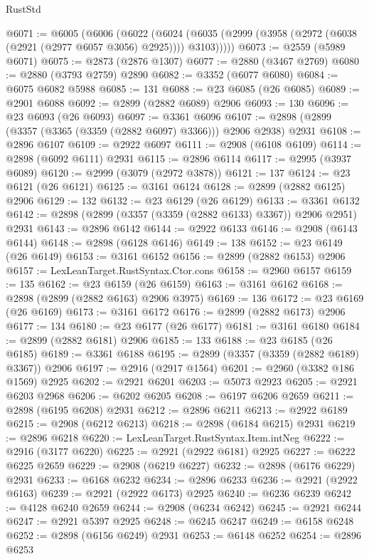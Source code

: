 \begin{lexlean}{RustStd}
\begin{coremodule}
@6071 := @6005
    (@6006
      (@6022
        (@6024 (@6035 (@2999 (@3958 (@2972 (@6038 (@2921 (@2977 @6057 @3056) @2925)))) @3103)))))
@6073 := @2559 (@5989 @6071)
@6075 := @2873 (@2876 @1307)
@6077 := @2880 (@3467 @2769)
@6080 := @2880 (@3793 @2759) @2890
@6082 := @3352 (@6077 @6080)
@6084 := @6075 @6082 @5988
@6085 := 131
@6088 := @23 @6085 (@26 @6085)
@6089 := @2901 @6088
@6092 := @2899 (@2882 @6089) @2906
@6093 := 130
@6096 := @23 @6093 (@26 @6093)
@6097 := @3361 @6096
@6107 := @2898 (@2899 (@3357 (@3365 (@3359 (@2882 @6097) @3366))) @2906 @2938) @2931
@6108 := @2896 @6107
@6109 := @2922 @6097
@6111 := @2908 (@6108 @6109)
@6114 := @2898 (@6092 @6111) @2931
@6115 := @2896 @6114
@6117 := @2995 (@3937 @6089)
@6120 := @2999 (@3079 (@2972 @3878))
@6121 := 137
@6124 := @23 @6121 (@26 @6121)
@6125 := @3161 @6124
@6128 := @2899 (@2882 @6125) @2906
@6129 := 132
@6132 := @23 @6129 (@26 @6129)
@6133 := @3361 @6132
@6142 := @2898 (@2899 (@3357 (@3359 (@2882 @6133) @3367)) @2906 @2951) @2931
@6143 := @2896 @6142
@6144 := @2922 @6133
@6146 := @2908 (@6143 @6144)
@6148 := @2898 (@6128 @6146)
@6149 := 138
@6152 := @23 @6149 (@26 @6149)
@6153 := @3161 @6152
@6156 := @2899 (@2882 @6153) @2906
@6157 := LexLeanTarget.RustSyntax.Ctor.cons
@6158 := @2960 @6157
@6159 := 135
@6162 := @23 @6159 (@26 @6159)
@6163 := @3161 @6162
@6168 := @2898 (@2899 (@2882 @6163) @2906 @3975)
@6169 := 136
@6172 := @23 @6169 (@26 @6169)
@6173 := @3161 @6172
@6176 := @2899 (@2882 @6173) @2906
@6177 := 134
@6180 := @23 @6177 (@26 @6177)
@6181 := @3161 @6180
@6184 := @2899 (@2882 @6181) @2906
@6185 := 133
@6188 := @23 @6185 (@26 @6185)
@6189 := @3361 @6188
@6195 := @2899 (@3357 (@3359 (@2882 @6189) @3367)) @2906
@6197 := @2916 (@2917 @1564)
@6201 := @2960 (@3382 @186 @1569) @2925
@6202 := @2921 @6201
@6203 := @5073 @2923
@6205 := @2921 @6203 @2968
@6206 := @6202 @6205
@6208 := @6197 @6206 @2659
@6211 := @2898 (@6195 @6208) @2931
@6212 := @2896 @6211
@6213 := @2922 @6189
@6215 := @2908 (@6212 @6213)
@6218 := @2898 (@6184 @6215) @2931
@6219 := @2896 @6218
@6220 := LexLeanTarget.RustSyntax.Item.intNeg
@6222 := @2916 (@3177 @6220)
@6225 := @2921 (@2922 @6181) @2925
@6227 := @6222 @6225 @2659
@6229 := @2908 (@6219 @6227)
@6232 := @2898 (@6176 @6229) @2931
@6233 := @6168 @6232
@6234 := @2896 @6233
@6236 := @2921 (@2922 @6163)
@6239 := @2921 (@2922 @6173) @2925
@6240 := @6236 @6239
@6242 := @4128 @6240 @2659
@6244 := @2908 (@6234 @6242)
@6245 := @2921 @6244
@6247 := @2921 @5397 @2925
@6248 := @6245 @6247
@6249 := @6158 @6248
@6252 := @2898 (@6156 @6249) @2931
@6253 := @6148 @6252
@6254 := @2896 @6253

\end{coremodule}
\end{lexlean}
